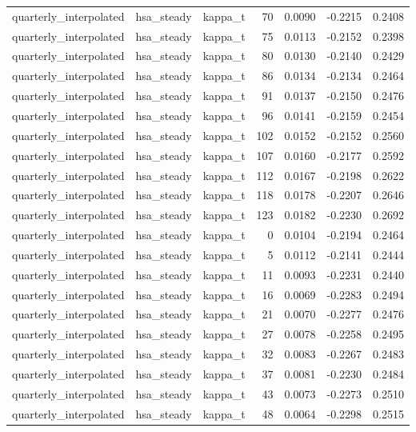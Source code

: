 \begin{tabular}{lllrrrr}
quarterly\_interpolated & hsa\_steady & kappa\_t & 70 & 0.0090 & -0.2215 & 0.2408 \\
quarterly\_interpolated & hsa\_steady & kappa\_t & 75 & 0.0113 & -0.2152 & 0.2398 \\
quarterly\_interpolated & hsa\_steady & kappa\_t & 80 & 0.0130 & -0.2140 & 0.2429 \\
quarterly\_interpolated & hsa\_steady & kappa\_t & 86 & 0.0134 & -0.2134 & 0.2464 \\
quarterly\_interpolated & hsa\_steady & kappa\_t & 91 & 0.0137 & -0.2150 & 0.2476 \\
quarterly\_interpolated & hsa\_steady & kappa\_t & 96 & 0.0141 & -0.2159 & 0.2454 \\
quarterly\_interpolated & hsa\_steady & kappa\_t & 102 & 0.0152 & -0.2152 & 0.2560 \\
quarterly\_interpolated & hsa\_steady & kappa\_t & 107 & 0.0160 & -0.2177 & 0.2592 \\
quarterly\_interpolated & hsa\_steady & kappa\_t & 112 & 0.0167 & -0.2198 & 0.2622 \\
quarterly\_interpolated & hsa\_steady & kappa\_t & 118 & 0.0178 & -0.2207 & 0.2646 \\
quarterly\_interpolated & hsa\_steady & kappa\_t & 123 & 0.0182 & -0.2230 & 0.2692 \\
quarterly\_interpolated & hsa\_steady & kappa\_t & 0 & 0.0104 & -0.2194 & 0.2464 \\
quarterly\_interpolated & hsa\_steady & kappa\_t & 5 & 0.0112 & -0.2141 & 0.2444 \\
quarterly\_interpolated & hsa\_steady & kappa\_t & 11 & 0.0093 & -0.2231 & 0.2440 \\
quarterly\_interpolated & hsa\_steady & kappa\_t & 16 & 0.0069 & -0.2283 & 0.2494 \\
quarterly\_interpolated & hsa\_steady & kappa\_t & 21 & 0.0070 & -0.2277 & 0.2476 \\
quarterly\_interpolated & hsa\_steady & kappa\_t & 27 & 0.0078 & -0.2258 & 0.2495 \\
quarterly\_interpolated & hsa\_steady & kappa\_t & 32 & 0.0083 & -0.2267 & 0.2483 \\
quarterly\_interpolated & hsa\_steady & kappa\_t & 37 & 0.0081 & -0.2230 & 0.2484 \\
quarterly\_interpolated & hsa\_steady & kappa\_t & 43 & 0.0073 & -0.2273 & 0.2510 \\
quarterly\_interpolated & hsa\_steady & kappa\_t & 48 & 0.0064 & -0.2298 & 0.2515 \\

\end{tabular}
